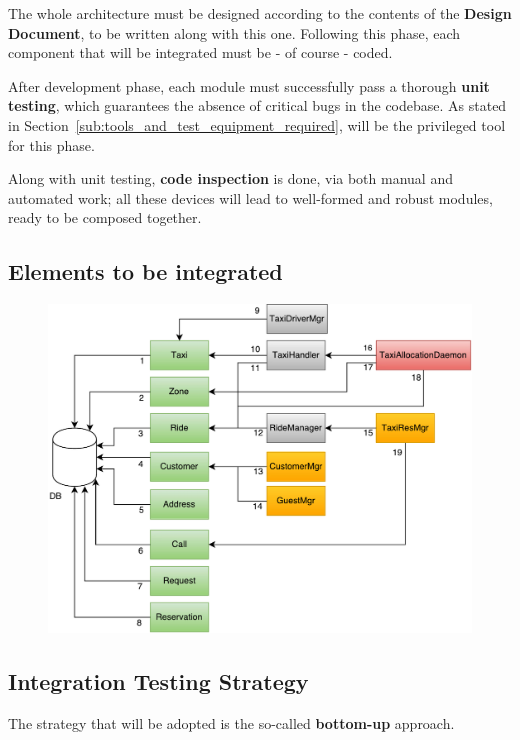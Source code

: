 \documentclass[a4paper, 12pt]{article}
\begin{document}
The whole architecture must be designed according to the contents of the \textbf{Design Document}, to be written along with this one.
Following this phase, each component that will be integrated must be - of course - coded.

After development phase, each module must successfully pass a thorough \textbf{unit testing}, which guarantees the absence of critical bugs in the codebase. As stated in Section~\ref{sub:tools_and_test_equipment_required},  will be the privileged tool for this phase.

Along with unit testing, \textbf{code inspection} is done, via both manual and automated work; all these devices will lead to well-formed and robust modules, ready to be composed together.

\subsection{Elements to be integrated}
\label{sub:elements_to_be_integrated}


\begin{figure}[htb]
    \centering
    \includegraphics[width=1.2\textwidth]{img/elements.pdf}
    \label{fig:testplan}
\end{figure}



\subsection{Integration Testing Strategy}
\label{sub:integration_testing_strategy}
The strategy that will be adopted is the so-called \textbf{bottom-up} approach.
\end{document}
